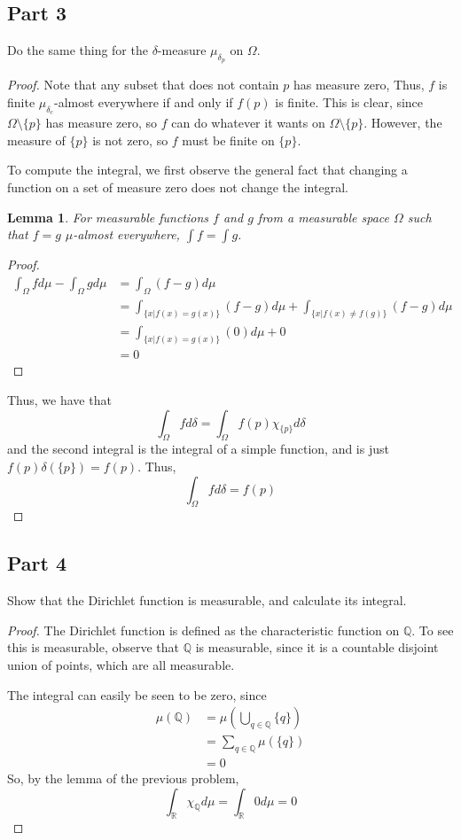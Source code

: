 \documentclass[fontsize=11pt]{scrartcl} %
\numberwithin{equation}{section} %
\numberwithin{figure}{section} %
\numberwithin{table}{section} %
\newcommand{\R}{\mathbb{R}}
\newcommand{\Q}{\mathbb{Q}}
\newtheorem*{lemma}{Lemma}
\begin{document}
\subsection*{Part 3}
Do the same thing for the $\delta$-measure $\mu_{\delta_p}$ on $\Omega$.
\\
\begin{proof}
Note that any subset that does not contain $p$ has measure zero, Thus, $f$ is finite
$\mu_{\delta_c}$-almost everywhere if and only if $f(p)$ is finite. This is clear, since
$\Omega\setminus\{p\}$ has measure zero, so $f$ can do whatever it wants on $\Omega\setminus\{p\}$.
However, the measure of $\{p\}$ is not zero, so $f$ must be finite on $\{p\}$.

To compute the integral, we first observe the general fact that changing a function on
a set of measure zero does not change the integral.
\begin{lemma}
For measurable functions $f$ and $g$ from a measurable space $\Omega$ such that $f=g$ 
$\mu$-almost everywhere, $\int f = \int g$.
\end{lemma}
\begin{proof}
\[
\begin{aligned}
\int_{\Omega}fd\mu -\int_{\Omega}gd\mu  &= \int_{\Omega} (f - g)d\mu\\
                                &= \int_{\{x | f(x) = g(x)\}}(f-g)d\mu + \int_{\{x|f(x)\neq f(g)\}}(f-g)d\mu\\
                                &= \int_{\{x | f(x) = g(x)\}}(0)d\mu + 0\\
                                &= 0
\end{aligned}
\]
\end{proof}
Thus, we have that
\[
\int_{\Omega} fd\delta = \int_{\Omega}f(p)\chi_{\{p\}}d\delta
\]
and the second integral is the integral of a simple function, and is just $f(p)\delta(\{p\}) = f(p)$.
Thus,
\[
\int_{\Omega}fd\delta = f(p)
\]
\end{proof}

\subsection*{Part 4}
Show that the Dirichlet function is measurable, and calculate its integral.
\\
\begin{proof}
The Dirichlet function is defined as the characteristic function on $\Q$. To see this 
is measurable, observe that $\Q$ is measurable, since it is a countable disjoint union of
points, which are all measurable.

The integral can easily be seen to be zero, since
\[
\begin{aligned}
\mu(\Q) &= \mu\left(\bigcup_{q\in\Q} \{q\}\right)\\
        &= \sum_{q\in\Q}\mu(\{q\})\\
        &= 0
\end{aligned}
\]
So, by the lemma of the previous problem,
\[
\int_{\R} \chi_{\Q}d\mu = \int_{\R} 0 d\mu = 0
\]
\end{proof}
\end{document}
